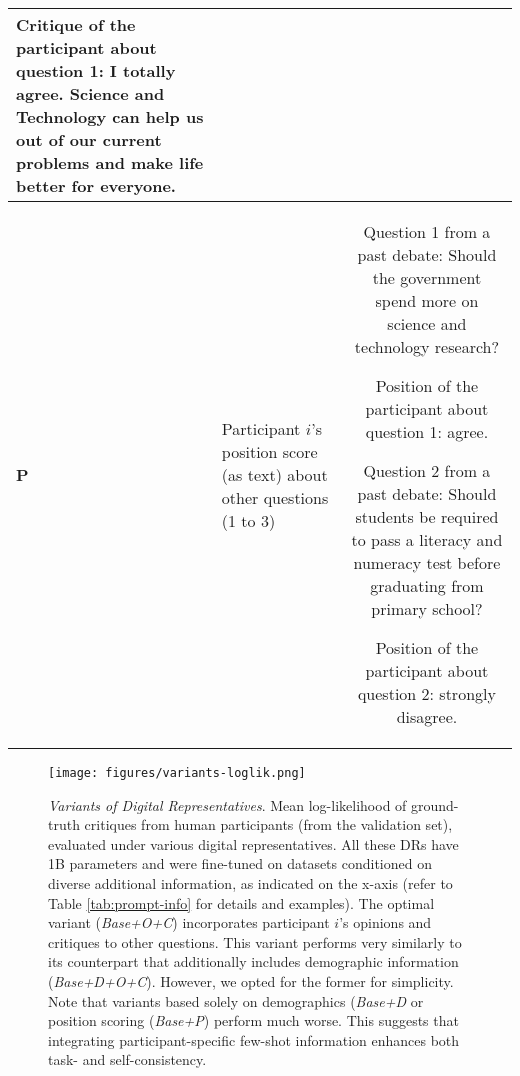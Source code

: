 \begin{table}[H]
\begin{center}
\begin{adjustbox}{max width=1.005\textwidth}
\begin{tabular}{A|B|C}
Critique of the participant about question 1: I totally agree. Science and Technology can help us out of our current problems and make life better for everyone. 
\\
\midrule
\textbf{P}
&
Participant $i$’s position score (as text) about other questions (1 to 3)
&
Question 1 from a past debate: Should the government spend more on science and technology research?

Position of the participant about question 1: agree.

Question 2 from a past debate: Should students be required to pass a literacy and numeracy test before graduating from primary school?

Position of the participant about question 2: strongly disagree.
\\
\bottomrule
\end{tabular}
\end{adjustbox}
\end{center}
\vspace{-1em}
\end{table}


\begin{figure}[H]
\centering
\texttt{[image: figures/variants-loglik.png]}
\caption{\textit{Variants of Digital Representatives}. Mean log-likelihood of ground-truth critiques from human participants (from the validation set), evaluated under various digital representatives. All these DRs have 1B parameters and were fine-tuned on datasets conditioned on diverse additional information, as indicated on the x-axis (refer to Table \ref{tab:prompt-info} for details and examples). The optimal variant (\textit{Base+O+C}) incorporates participant $i$'s opinions and critiques to other questions. This variant performs very similarly to its counterpart that additionally includes demographic information (\textit{Base+D+O+C}). However, we opted for the former for simplicity. Note that variants based solely on demographics (\textit{Base+D} or position scoring (\textit{Base+P}) perform much worse. This suggests that integrating participant-specific few-shot information enhances both task- and self-consistency.}
\label{fig:dr-variants}
\end{figure}


